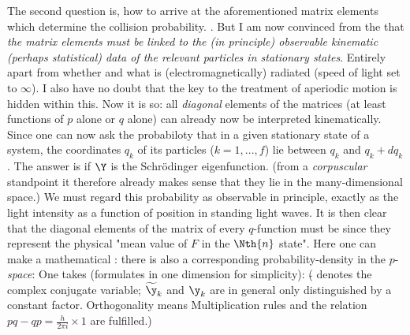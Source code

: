 The second question is, how to arrive at the aforementioned matrix elements which determine the collision probability. . But I am now convinced from the  that \textit{the matrix elements must be linked to the (in principle) observable kinematic (perhaps statistical) data of the relevant particles in stationary states}. Entirely apart from whether and what is (electromagnetically) radiated (speed of light set to $\infty$). I also have no doubt that the key to the treatment of aperiodic motion is hidden within this. Now it is so: all \textit{diagonal} elements of the matrices (at least functions of $p$ alone or $q$ alone) can already now be interpreted kinematically. Since one can now ask the probabiloty that in a given stationary state of a system, the coordinates $q_k$ of its particles ($k=1,...,f$) lie between $q_k$ and $q_k + dq_k$. The answer is
if $\Y$ is the Schr\"odinger eigenfunction. (from a \textit{corpuscular} standpoint it therefore already makes sense that they lie in the many-dimensional space.) We must regard this probability as observable in principle, exactly as the light intensity as a function of position in standing light waves. It is then clear that the diagonal elements of the matrix of every $q$-function must be
since they represent the physical "mean value of $F$ in the $\Nth{n}$ state". Here one can make a mathematical : there is also a corresponding probability-density in the $p$-\textit{space}: One takes (formulates in one dimension for simplicity):
($\widetilde{}$ denotes the complex conjugate variable; $\widetilde{\y}_k$ and $\y_k$ are in general only distinguished by a constant factor. Orthogonality means
Multiplication rules and the relation $pq-qp=\frac{h}{2\pi i}\times 1$ are fulfilled.)

